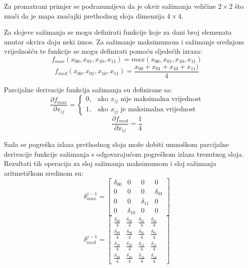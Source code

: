 \documentclass[times, utf8, zavrsni, numeric]{fer}
\begin{document}
Za promatrani primjer se podrazumijeva da je okvir sažimanja veličine $2 \times 2$ što znači da je mapa značajki prethodnog sloja dimenzija $4 \times 4$.

Za slojeve sažimanja se mogu definirati funkcije koje za dani broj elemenata unutar okvira daju neki iznos. Za sažimanje maksimumom i sažimanje srednjom vrijednošću te funkcije se mogu definirati pomoću sljedećih izraza:
\begin{equation}
f_{max}(x_{00}, x_{01}, x_{10}, x_{11}) = max(x_{00}, x_{01}, x_{10}, x_{11})
\end{equation}
\begin{equation}
f_{med}(x_{00}, x_{01}, x_{10}, x_{11}) = \frac{x_{00} + x_{01} + x_{10} + x_{11})}{4}
\end{equation}

Parcijalne derivacije funkcija sažimanja su definirane sa:
\begin{equation}
\dfrac{\partial f_{max}}{\partial x_{ij}} = \begin{cases}
    0, & \text{ako $x_{ij}$ nije maksimalna vrijednost}\\
    1, & \text{ako $x_{ij}$ je maksimalna vrijednost}
  \end{cases}
\end{equation}
\begin{equation}
\dfrac{\partial f_{med}}{\partial x_{ij}} = \frac{1}{4}
\end{equation}

Sada se pogreška izlaza prethodnog sloja može dobiti umnoškom parcijalne derivacije funkcije sažimanja s odgovarajućom pogreškom izlaza trenutnog sloja. Rezultati tih operacija za sloj sažimanja maksimumom i sloj sažimanja aritmetičkom sredinom su:
\begin{equation}
\delta^{j-1}_{max} = \left[
\begin{matrix}
\delta_{00} & 0 & 0 & 0 \\
0 & 0 & 0 & \delta_{01} \\
0 & 0 & \delta_{11} & 0\\
0 & \delta_{10} & 0 & 0 
\end{matrix}
\right]
\end{equation}
\begin{equation}
\delta^{j-1}_{med} = \left[
\begin{matrix}
\frac{\delta_{00}}{4} & \frac{\delta_{00}}{4} & \frac{\delta_{01}}{4} & \frac{\delta_{01}}{4} & \\
\frac{\delta_{00}}{4} & \frac{\delta_{00}}{4} & \frac{\delta_{01}}{4} & \frac{\delta_{01}}{4} & \\
\frac{\delta_{10}}{4} & \frac{\delta_{10}}{4} & \frac{\delta_{11}}{4} & \frac{\delta_{11}}{4} & \\
\frac{\delta_{10}}{4} & \frac{\delta_{10}}{4} & \frac{\delta_{11}}{4} & \frac{\delta_{11}}{4} &
\end{matrix}
\right]
\end{equation}
\end{document}
